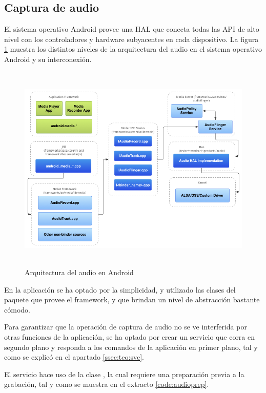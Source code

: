 \subsection{Captura de audio}
    El sistema operativo Android provee una \ac{HAL} que conecta todas las \ac{API} de alto nivel con los controladores y hardware subyacentes en cada dispositivo. La figura \ref{fig:diagrama:audiohal} muestra los distintos niveles de la arquitectura del audio en el sistema operativo Android y su interconexión.
\begin{figure}[h] \centering
    \includegraphics[height=10cm]{graphs/audio_hal.png} \caption{Arquitectura del audio en Android  \cite{audiohal}}\label{fig:diagrama:audiohal}
\end{figure}

En la aplicación se ha optado por la simplicidad, y utilizado las clases del paquete  que provee el framework, y que brindan un nivel de abstracción bastante cómodo.

Para garantizar que la operación de captura de audio no se ve interferida por otras funciones de la aplicación, se ha optado por crear un servicio que corra en segundo plano y responda a los comandos de la aplicación en primer plano, tal y como se explicó en el apartado \ref{ssec:teo:svc}.

El servicio hace uso de la clase , la cual requiere una preparación previa a la grabación, tal y como se muestra en el extracto \ref{code:audioprep}.

